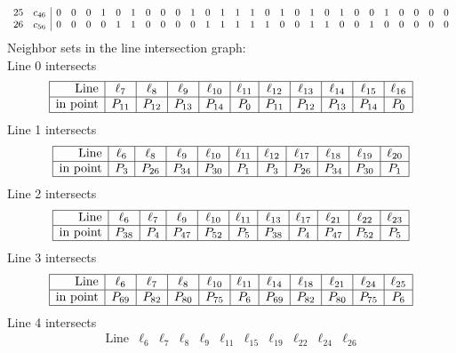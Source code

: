 \documentclass{article}
\begin{document}
{{$$\begin{array}{rr|*{27}r}
25 & c_{46} & 0 & 0 & 0 & 1 & 0 & 1 & 0 & 0 & 0 & 1 & 0 & 1 & 1 & 1 & 0 & 1 & 0 & 1 & 0 & 1 & 0 & 0 & 1 & 0 & 0 & 0 & 0\\
26 & c_{56} & 0 & 0 & 0 & 0 & 1 & 1 & 0 & 0 & 0 & 0 & 1 & 1 & 1 & 1 & 1 & 0 & 0 & 1 & 1 & 0 & 0 & 1 & 0 & 0 & 0 & 0 & 0\\
\end{array}
$$
}%
Neighbor sets in the line intersection graph:\\
Line 0 intersects 
$$
\begin{array}{|r*{10}{|c}|}
\hline
\mbox{Line}  & \ell_{7} & \ell_{8} & \ell_{9} & \ell_{10} & \ell_{11} & \ell_{12} & \ell_{13} & \ell_{14} & \ell_{15} & \ell_{16}\\
\hline
\mbox{in point}  & P_{11} & P_{12} & P_{13} & P_{14} & P_{0} & P_{11} & P_{12} & P_{13} & P_{14} & P_{0}\\
\hline
\end{array}
$$
Line 1 intersects 
$$
\begin{array}{|r*{10}{|c}|}
\hline
\mbox{Line}  & \ell_{6} & \ell_{8} & \ell_{9} & \ell_{10} & \ell_{11} & \ell_{12} & \ell_{17} & \ell_{18} & \ell_{19} & \ell_{20}\\
\hline
\mbox{in point}  & P_{3} & P_{26} & P_{34} & P_{30} & P_{1} & P_{3} & P_{26} & P_{34} & P_{30} & P_{1}\\
\hline
\end{array}
$$
Line 2 intersects 
$$
\begin{array}{|r*{10}{|c}|}
\hline
\mbox{Line}  & \ell_{6} & \ell_{7} & \ell_{9} & \ell_{10} & \ell_{11} & \ell_{13} & \ell_{17} & \ell_{21} & \ell_{22} & \ell_{23}\\
\hline
\mbox{in point}  & P_{38} & P_{4} & P_{47} & P_{52} & P_{5} & P_{38} & P_{4} & P_{47} & P_{52} & P_{5}\\
\hline
\end{array}
$$
Line 3 intersects 
$$
\begin{array}{|r*{10}{|c}|}
\hline
\mbox{Line}  & \ell_{6} & \ell_{7} & \ell_{8} & \ell_{10} & \ell_{11} & \ell_{14} & \ell_{18} & \ell_{21} & \ell_{24} & \ell_{25}\\
\hline
\mbox{in point}  & P_{69} & P_{82} & P_{80} & P_{75} & P_{6} & P_{69} & P_{82} & P_{80} & P_{75} & P_{6}\\
\hline
\end{array}
$$
Line 4 intersects 
$$
\begin{array}{|r*{10}{|c}|}
\hline
\mbox{Line}  & \ell_{6} & \ell_{7} & \ell_{8} & \ell_{9} & \ell_{11} & \ell_{15} & \ell_{19} & \ell_{22} & \ell_{24} & \ell_{26}\\

\end{array}$$}
\end{document}
